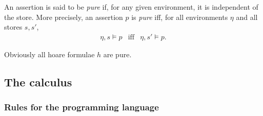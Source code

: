 \documentclass[12pt,a4paper]{article}
\begin{document}
\begin{definition}
  An assertion is said to be {\em pure} if, for any given environment, it is independent of the store.
  More precisely, an assertion $p$ is {\em pure} iff, for all environments $\eta$ and all stores $s, s'$,
  \[\begin{array}{rcl}
    \eta,s \models p &\text{iff}& \eta,s' \models p.
  \end{array}\]
\end{definition}

Obviously all hoare formulae $h$ are pure.


\subsection{The calculus}

\subsubsection{Rules for the programming language}
\end{document}

